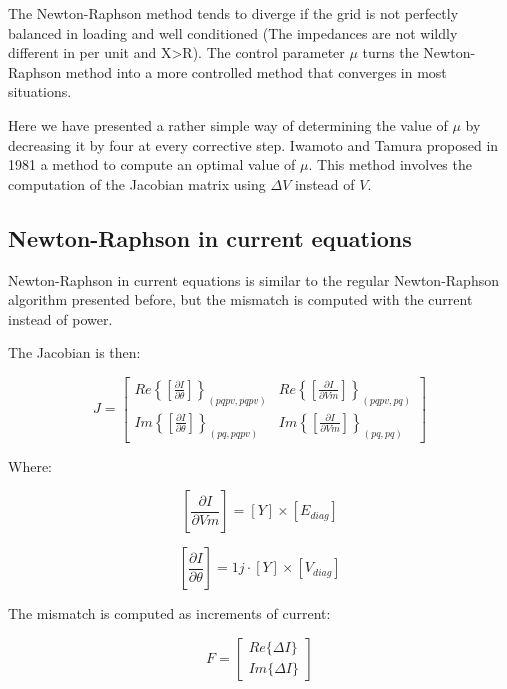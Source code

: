 \documentclass[nols,a4paper,twoside,notoc,fleqn]{tufte-book}
\begin{document}
The Newton-Raphson method tends to diverge if the grid is not perfectly balanced in loading and well conditioned (The impedances are not wildly different in per unit and X>R). The control parameter $\mu$ turns the Newton-Raphson method into a more controlled method that converges in most situations.

Here we have presented a rather simple way of determining the value of $\mu$ by decreasing it by four at every corrective step. Iwamoto and Tamura proposed in 1981 a method \cite{iwamoto1981load} to compute an optimal value of $\mu$. This method involves the computation of the Jacobian matrix using $\Delta V$ instead of $V$. 


\subsection{Newton-Raphson in current equations} \label{NRI-Method}


Newton-Raphson in current equations is similar to the regular Newton-Raphson algorithm presented before, but the mismatch is computed with the current instead of power.

The Jacobian is then:

\begin{equation}
J=
\left[
\begin{array}{cc}
Re\left\{\left[\frac{\partial I}{\partial \theta}\right]\right\}_{(pqpv, pqpv)} &
Re\left\{\left[\frac{\partial I}{\partial Vm}\right]\right\}_{(pqpv, pq)} \\
Im\left\{\left[\frac{\partial I}{\partial \theta}\right]\right\}_{(pq, pqpv)} &
Im\left\{\left[\frac{\partial I}{\partial Vm}\right]\right\}_{(pq,pq)}
\end{array}
\right]
\end{equation}

Where:

\begin{equation}
\left[\frac{\partial I}{\partial Vm}\right] = [Y] \times [E_{diag}]
\end{equation}

\begin{equation}
\left[\frac{\partial I}{\partial \theta}\right] = 1j \cdot [Y] \times [V_{diag}]
\end{equation}


The mismatch is computed as increments of current:

\begin{equation}
F =  \left[
\begin{array}{c}
 Re\{\Delta I\} \\
 Im\{\Delta I\}  
\end{array}
\right]
\label{eq:nri_mismatch}
\end{equation}
\end{document}
